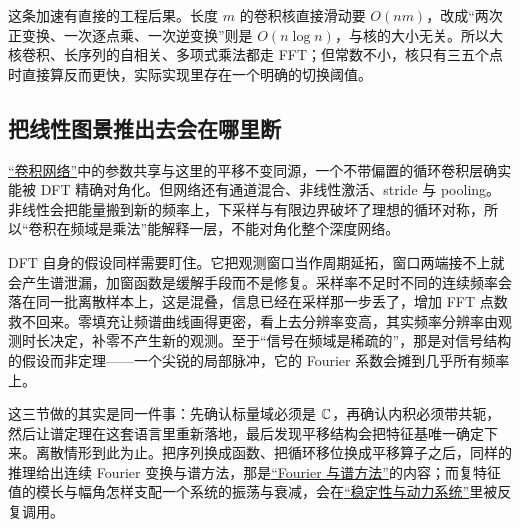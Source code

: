 这条加速有直接的工程后果。长度 \(m\) 的卷积核直接滑动要 \(O(nm)\)，改成``两次正变换、一次逐点乘、一次逆变换''则是 \(O(n\log n)\)，与核的大小无关。所以大核卷积、长序列的自相关、多项式乘法都走 FFT；但常数不小，核只有三五个点时直接算反而更快，实际实现里存在一个明确的切换阈值。

\subsection{把线性图景推出去会在哪里断}

\hyperref[ch:126]{``卷积网络''}中的参数共享与这里的平移不变同源，一个不带偏置的循环卷积层确实能被 DFT 精确对角化。但网络还有通道混合、非线性激活、stride 与 pooling。非线性会把能量搬到新的频率上，下采样与有限边界破坏了理想的循环对称，所以``卷积在频域是乘法''能解释一层，不能对角化整个深度网络。

DFT 自身的假设同样需要盯住。它把观测窗口当作周期延拓，窗口两端接不上就会产生谱泄漏，加窗函数是缓解手段而不是修复。采样率不足时不同的连续频率会落在同一批离散样本上，这是混叠，信息已经在采样那一步丢了，增加 FFT 点数救不回来。零填充让频谱曲线画得更密，看上去分辨率变高，其实频率分辨率由观测时长决定，补零不产生新的观测。至于``信号在频域是稀疏的''，那是对信号结构的假设而非定理——一个尖锐的局部脉冲，它的 Fourier 系数会摊到几乎所有频率上。

这三节做的其实是同一件事：先确认标量域必须是 \(\mathbb{C}\)，再确认内积必须带共轭，然后让谱定理在这套语言里重新落地，最后发现平移结构会把特征基唯一确定下来。离散情形到此为止。把序列换成函数、把循环移位换成平移算子之后，同样的推理给出连续 Fourier 变换与谱方法，那是\hyperref[ch:068]{``Fourier 与谱方法''}的内容；而复特征值的模长与幅角怎样支配一个系统的振荡与衰减，会在\hyperref[ch:135]{``稳定性与动力系统''}里被反复调用。
